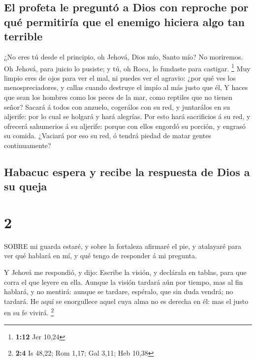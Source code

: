 \hypertarget{el-profeta-le-preguntuxf3-a-dios-con-reproche-por-quuxe9-permitiruxeda-que-el-enemigo-hiciera-algo-tan-terrible}{%
\subsection{El profeta le preguntó a Dios con reproche por qué
permitiría que el enemigo hiciera algo tan
terrible}\label{el-profeta-le-preguntuxf3-a-dios-con-reproche-por-quuxe9-permitiruxeda-que-el-enemigo-hiciera-algo-tan-terrible}}

 ¿No eres tú desde el principio, oh Jehová, Dios mío, Santo
mío? No moriremos. Oh Jehová, para juicio lo pusiste; y tú, oh Roca, lo
fundaste para castigar. \footnote{\textbf{1:12} Jer 10,24} 
Muy limpio eres de ojos para ver el mal, ni puedes ver el agravio: ¿por
qué ves los menospreciadores, y callas cuando destruye el impío al más
justo que él,  Y haces que sean los hombres como los peces
de la mar, como reptiles que no tienen señor?  Sacará á
todos con anzuelo, cogerálos con su red, y juntarálos en su aljerife:
por lo cual se holgará y hará alegrías.  Por esto hará
sacrificios á su red, y ofrecerá sahumerios á su aljerife: porque con
ellos engordó su porción, y engrasó su comida.  ¿Vaciará
por eso su red, ó tendrá piedad de matar gentes continuamente?

\hypertarget{habacuc-espera-y-recibe-la-respuesta-de-dios-a-su-queja}{%
\subsection{Habacuc espera y recibe la respuesta de Dios a su
queja}\label{habacuc-espera-y-recibe-la-respuesta-de-dios-a-su-queja}}

\hypertarget{section-1}{%
\section{2}\label{section-1}}

 SOBRE mi guarda estaré, y sobre la fortaleza afirmaré el
pie, y atalayaré para ver qué hablará en mí, y qué tengo de responder á
mi pregunta.

 Y Jehová me respondió, y dijo: Escribe la visión, y
declárala en tablas, para que corra el que leyere en ella. 
Aunque la visión tardará aún por tiempo, mas al fin hablará, y no
mentirá: aunque se tardare, espéralo, que sin duda vendrá; no tardará.
 He aquí se enorgullece aquel cuya alma no es derecha en él:
mas el justo en su fe vivirá. \footnote{\textbf{2:4} Is 48,22; Rom 1,17;
  Gal 3,11; Heb 10,38}

